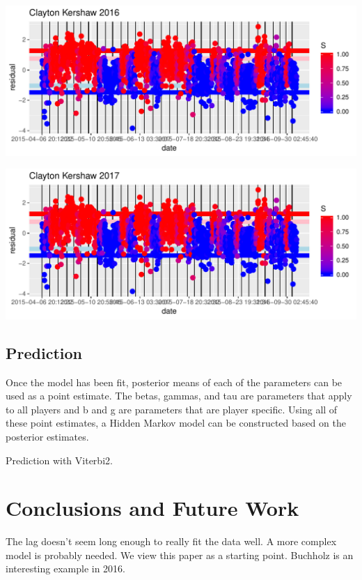 \documentclass[letterpaper,12pt]{article}\usepackage[]{graphicx}\usepackage[]{color}
\makeatletter
\def\maxwidth{ %
  \ifdim\Gin@nat@width>\linewidth
    \linewidth
  \else
    \Gin@nat@width
  \fi
}
\newenvironment{knitrout}{}{} %
\makeatother
\begin{document}
\begin{knitrout}
\color{fgcolor}
\includegraphics[width=\maxwidth]{figure/unnamed-chunk-2-1} 

\end{knitrout}


\begin{knitrout}
\color{fgcolor}
\includegraphics[width=\maxwidth]{figure/unnamed-chunk-3-1} 

\end{knitrout}

\subsection{Prediction}
Once the model has been fit, posterior means of each of the parameters can be used as a point estimate.  The betas, gammas, and tau are parameters that apply to all players and b and g are parameters that are player specific.  Using all of these point estimates, a Hidden Markov model can be constructed based on the posterior estimates.  

Prediction with Viterbi2.  

\section{Conclusions and Future Work}
The lag doesn't seem long enough to really fit the data well.  A more complex model is probably needed.  We view this paper as a starting point.  Buchholz is an interesting example in 2016.  
\end{document}
